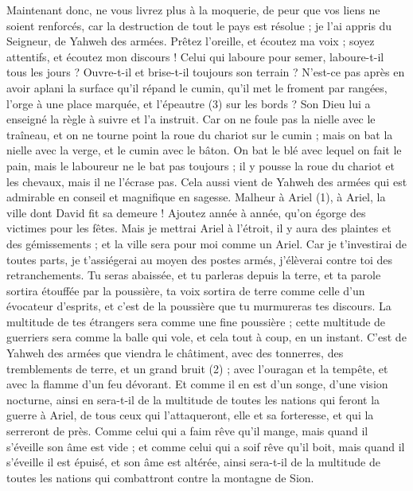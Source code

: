 \begin{multicols}{2}
Maintenant donc, ne vous livrez plus à la moquerie, de peur que vos liens ne soient renforcés, car la destruction de tout le pays est résolue ; je l’ai appris du Seigneur, de Yahweh des armées.
Prêtez l'oreille, et écoutez ma voix ; soyez attentifs, et écoutez mon discours !
Celui qui laboure pour semer, laboure-t-il tous les jours ? Ouvre-t-il et brise-t-il toujours son terrain ?
N’est-ce pas après en avoir aplani la surface qu’il répand le cumin, qu’il met le froment par rangées, l’orge à une place marquée, et l’épeautre (3) sur les bords ?
Son Dieu lui a enseigné la règle à suivre et l’a instruit.
Car on ne foule pas la nielle avec le traîneau, et on ne tourne point la roue du chariot sur le cumin ; mais on bat la nielle avec la verge, et le cumin avec le bâton.
On bat le blé avec lequel on fait le pain, mais le laboureur ne le bat pas toujours ; il y pousse la roue du chariot et les chevaux, mais il ne l’écrase pas.
Cela aussi vient de Yahweh des armées qui est admirable en conseil et magnifique en sagesse.
\VerseOne{}Malheur à Ariel (1), à Ariel, la ville dont David fit sa demeure ! Ajoutez année à année, qu'on égorge des victimes pour les fêtes.
Mais je mettrai Ariel à l'étroit, il y aura des plaintes et des gémissements ; et la ville sera pour moi comme un Ariel.
Car je t’investirai de toutes parts, je t'assiégerai au moyen des postes armés, j’élèverai contre toi des retranchements.
Tu seras abaissée, et tu parleras depuis la terre, et ta parole sortira étouffée par la poussière, ta voix sortira de terre comme celle d’un évocateur d’esprits, et c’est de la poussière que tu murmureras tes discours.
La multitude de tes étrangers sera comme une fine poussière ; cette multitude de guerriers sera comme la balle qui vole, et cela tout à coup, en un instant.
C’est de Yahweh des armées que viendra le châtiment, avec des tonnerres, des tremblements de terre, et un grand bruit (2) ; avec l’ouragan et la tempête, et avec la flamme d’un feu dévorant.
Et comme il en est d’un songe, d’une vision nocturne, ainsi en sera-t-il de la multitude de toutes les nations qui feront la guerre à Ariel, de tous ceux qui l’attaqueront, elle et sa forteresse, et qui la serreront de près.
Comme celui qui a faim rêve qu'il mange, mais quand il s’éveille son âme est vide ; et comme celui qui a soif rêve qu'il boit, mais quand il s’éveille il est épuisé, et son âme est altérée, ainsi sera-t-il de la multitude de toutes les nations qui combattront contre la montagne de Sion.

\end{multicols}
